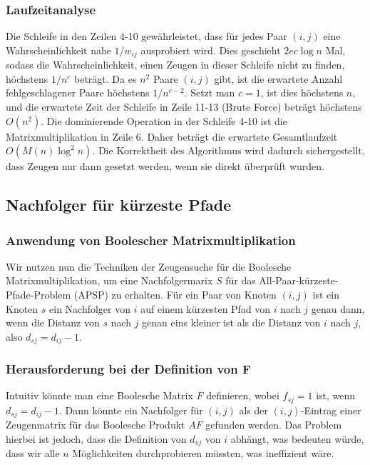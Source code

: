 \documentclass{scrartcl}
\numberwithin{equation}{section}
\begin{document}
\subsubsection{Laufzeitanalyse}
Die Schleife in den Zeilen 4-10 gewährleistet, dass für jedes Paar $(i, j)$ eine Wahrscheinlichkeit nahe $1/w_{ij}$ ausprobiert wird. Dies geschieht $2ec \log n$ Mal, sodass die Wahrscheinlichkeit, einen Zeugen in dieser Schleife nicht zu finden, höchstens $1/n^c$ beträgt. Da es $n^2$ Paare $(i, j)$ gibt, ist die erwartete Anzahl fehlgeschlagener Paare höchstens $1/n^{c-2}$. Setzt man $c=1$, ist dies höchstens $n$, und die erwartete Zeit der Schleife in Zeile 11-13 (Brute Force) beträgt höchstens $O(n^2)$. Die dominierende Operation in der Schleife 4-10 ist die Matrixmultiplikation in Zeile 6. Daher beträgt die erwartete Gesamtlaufzeit $O(M(n) \log^2 n)$. Die Korrektheit des Algorithmus wird dadurch sichergestellt, dass Zeugen nur dann gesetzt werden, wenn sie direkt überprüft wurden.

\subsection{Nachfolger für kürzeste Pfade}

\subsubsection{Anwendung von Boolescher Matrixmultiplikation}
Wir nutzen nun die Techniken der Zeugensuche für die Boolesche Matrixmultiplikation, um eine Nachfolgermarix $S$ für das All-Paar-kürzeste-Pfade-Problem (APSP) zu erhalten. Für ein Paar von Knoten $(i, j)$ ist ein Knoten $s$ ein Nachfolger von $i$ auf einem kürzesten Pfad von $i$ nach $j$ genau dann, wenn die Distanz von $s$ nach $j$ genau eins kleiner ist als die Distanz von $i$ nach $j$, also $d_{sj} = d_{ij}-1$.

\subsubsection{Herausforderung bei der Definition von F}
Intuitiv könnte man eine Boolesche Matrix $F$ definieren, wobei $f_{sj}=1$ ist, wenn $d_{sj}=d_{ij}-1$. Dann könnte ein Nachfolger für $(i, j)$ als der $(i, j)$-Eintrag einer Zeugenmatrix für das Boolesche Produkt $AF$ gefunden werden. Das Problem hierbei ist jedoch, dass die Definition von $d_{sj}$ von $i$ abhängt, was bedeuten würde, dass wir alle $n$ Möglichkeiten durchprobieren müssten, was ineffizient wäre.
\end{document}

